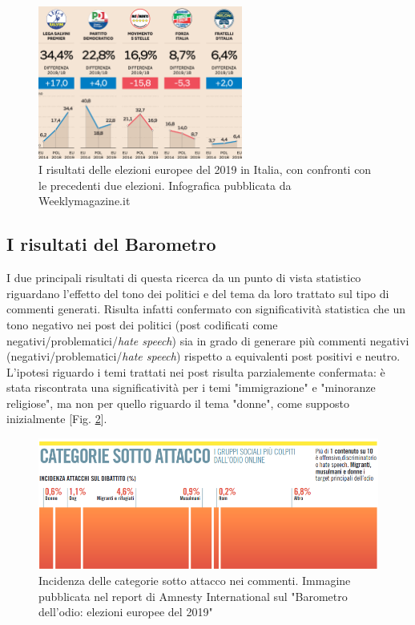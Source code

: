 \begin{figure}
	\centering
	\includegraphics[width=0.6\textwidth]{figures/europee}
	\caption{I risultati delle elezioni europee del 2019 in Italia, con confronti con le precedenti due elezioni. Infografica pubblicata da Weeklymagazine.it}
	\label{fig:europee}
\end{figure}


\subsection{I risultati del Barometro}
I due principali risultati di questa ricerca da un punto di vista statistico riguardano l'effetto del tono dei politici e del tema da loro trattato sul tipo di commenti generati.
Risulta infatti confermato con significatività statistica che un tono negativo nei post dei politici (post codificati come negativi/problematici/\textit{hate speech}) sia in grado di generare più commenti negativi (negativi/problematici/\textit{hate speech}) rispetto a equivalenti post positivi e neutro. 
L'ipotesi riguardo i temi trattati nei post risulta parzialemente confermata: è stata riscontrata una significatività per i temi "immigrazione" e "minoranze religiose", ma non per quello riguardo il tema "donne", come supposto inizialmente [Fig. \ref{fig:amntarget}]. 
\begin{figure}
	\centering
	\includegraphics[width=\textwidth]{figures/amntarget}
	\caption{Incidenza delle categorie sotto attacco nei commenti. Immagine pubblicata nel report di Amnesty International sul "Barometro dell'odio: elezioni europee del 2019"}
	\label{fig:amntarget}
\end{figure}

